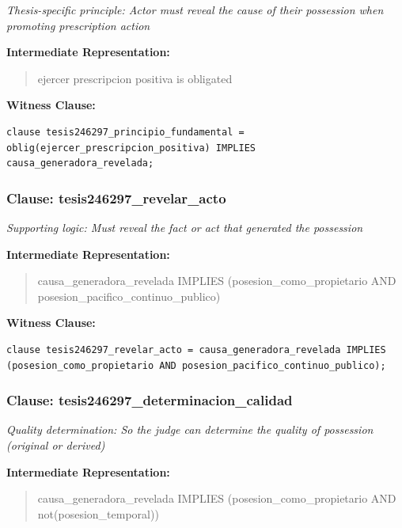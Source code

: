\documentclass[11pt,a4paper]{article}
\begin{document}
\textit{Thesis-specific principle: Actor must reveal the cause of their possession when promoting prescription action}

\textbf{Intermediate Representation:}

\begin{quote}
ejercer prescripcion positiva is obligated
\end{quote}

\textbf{Witness Clause:}

\begin{lstlisting}[style=witnessstyle, language=Witness]
clause tesis246297_principio_fundamental = oblig(ejercer_prescripcion_positiva) IMPLIES causa_generadora_revelada;
\end{lstlisting}

\subsubsection{Clause: tesis246297\_revelar\_acto}

\textit{Supporting logic: Must reveal the fact or act that generated the possession}

\textbf{Intermediate Representation:}

\begin{quote}
causa\_generadora\_revelada IMPLIES (posesion\_como\_propietario AND posesion\_pacifico\_continuo\_publico)
\end{quote}

\textbf{Witness Clause:}

\begin{lstlisting}[style=witnessstyle, language=Witness]
clause tesis246297_revelar_acto = causa_generadora_revelada IMPLIES (posesion_como_propietario AND posesion_pacifico_continuo_publico);
\end{lstlisting}

\subsubsection{Clause: tesis246297\_determinacion\_calidad}

\textit{Quality determination: So the judge can determine the quality of possession (original or derived)}

\textbf{Intermediate Representation:}

\begin{quote}
causa\_generadora\_revelada IMPLIES (posesion\_como\_propietario AND not(posesion\_temporal))
\end{quote}
\end{document}
